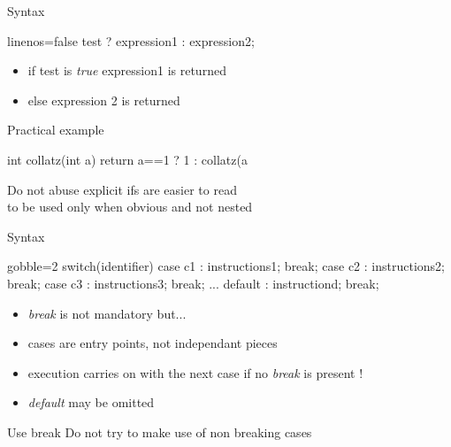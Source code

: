 \begin{frame}[fragile]
  \begin{block}{Syntax}
    \begin{cppcode*}{linenos=false}
      test ? expression1 : expression2;
    \end{cppcode*}
    \vspace{-0.3cm}
    \begin{itemize}
      \item if test is {\it true} expression1 is returned
      \item else expression 2 is returned
    \end{itemize}
  \end{block}
  \pause
  \begin{exampleblock}{Practical example}
    \begin{cppcode*}{}
      int collatz(int a) {
        return a==1 ? 1 : collatz(a%
      }
    \end{cppcode*}
  \end{exampleblock}
  \pause
  \begin{alertblock}{Do not abuse}
    explicit ifs are easier to read \\
    to be used only when obvious and not nested
  \end{alertblock}
\end{frame}

\begin{frame}[fragile]
  \begin{block}{Syntax}
    \begin{cppcode*}{gobble=2}
      switch(identifier) {
        case c1 : instructions1; break;
        case c2 : instructions2; break;
        case c3 : instructions3; break;
        ...
        default : instructiond; break;
      }
    \end{cppcode*}
    \begin{itemize}
      \item {\it break} is not mandatory but...
      \item cases are entry points, not independant pieces
      \item execution carries on with the next case if no {\it break} is present !
      \item {\it default} may be omitted
    \end{itemize}
  \end{block}
  \pause
  \begin{alertblock}{Use break}
    Do not try to make use of non breaking cases
  \end{alertblock}
\end{frame}

